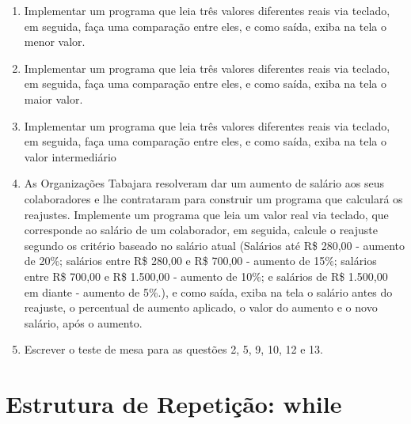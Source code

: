 \documentclass[11pt]{article}
\begin{document}
\begin{enumerate}
	\item Implementar um programa que leia três valores diferentes reais via teclado, em seguida, faça uma
	comparação entre eles, e como saída, exiba na tela o menor valor.
	
	\item  Implementar um programa que leia três valores diferentes reais via teclado, em seguida, faça uma
	comparação entre eles, e como saída, exiba na tela o maior valor.
	
	\item Implementar um programa que leia três valores diferentes reais via teclado, em seguida, faça uma
	comparação entre eles, e como saída, exiba na tela o valor intermediário
	
	\item As Organizações Tabajara resolveram dar um aumento de salário aos seus colaboradores e lhe
	contrataram para construir um programa que calculará os reajustes. Implemente um programa
	que leia um valor real via teclado, que corresponde ao salário de um colaborador, em seguida,
	calcule o reajuste segundo os critério baseado no salário atual (Salários até R\$ 280,00 - aumento
	de 20\%; salários entre R\$ 280,00 e R\$ 700,00 - aumento de 15\%; salários entre R\$ 700,00 e R\$
	1.500,00 - aumento de 10\%; e salários de R\$ 1.500,00 em diante - aumento de 5\%.), e como saída,
	exiba na tela o salário antes do reajuste, o percentual de aumento aplicado, o valor do aumento
	e o novo salário, após o aumento.
	
	\item  Escrever o teste de mesa para as questões 2, 5, 9, 10, 12 e 13.
\end{enumerate}

\newpage

\section{Estrutura de Repetição: while}
\end{document}

